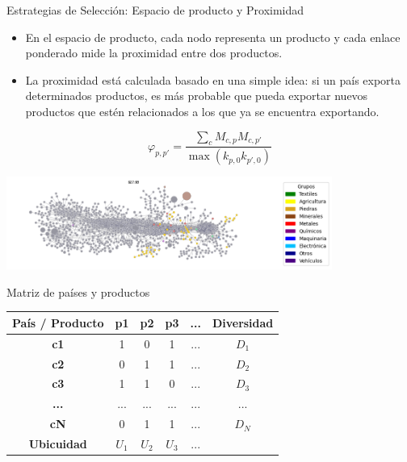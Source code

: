 \documentclass{beamer}
\begin{document}
\begin{frame}{Estrategias de Selección: Espacio de producto y Proximidad}
    \begin{itemize}
        \item En el espacio de producto, cada nodo representa un producto y cada enlace ponderado mide la proximidad entre dos productos.
        \item La proximidad está calculada basado en una simple idea: si un país exporta determinados productos, es más probable que pueda exportar nuevos productos que estén relacionados a los que ya se encuentra exportando.
    \end{itemize}
    \[
    \varphi_{p,p'} = \frac{\sum_{c}M_{c,p}M_{c,p'}}{\max(k_{p,0}k_{p',0})}
    \]
    \begin{center}
        \includegraphics[width=0.8\textwidth]{Figura14.png}
    \end{center}
\end{frame}

\begin{frame}{Matriz de países y productos}
    \begin{table}[h!]
    \centering
    \begin{tabular}{c|cccc|c}
        \hline
        \textbf{País / Producto} & \textbf{p1} & \textbf{p2} & \textbf{p3} & \textbf{...} & \textbf{Diversidad} \\
        \hline
        \textbf{c1} & 1 & 0 & 1 & ... & $D_1$ \\
        \textbf{c2} & 0 & 1 & 1 & ... & $D_2$ \\
        \textbf{c3} & 1 & 1 & 0 & ... & $D_3$ \\
        \textbf{...} & ... & ... & ... & ... & ... \\
        \textbf{cN} & 0 & 1 & 1 & ... & $D_N$ \\
        \hline
        \textbf{Ubicuidad} & $U_1$ & $U_2$ & $U_3$ & ... &  \\
        \hline
    \end{tabular}
    \end{table}
\end{frame}
\end{document}
